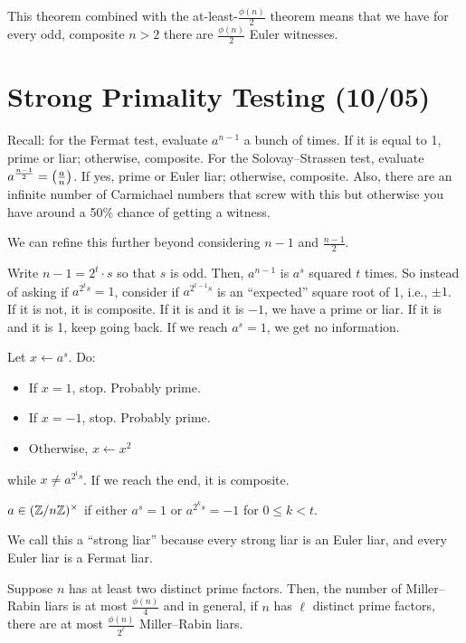 \documentclass[notes]{agony}
\newcommand{\leg}[2]{\qty(\frac{#1}{#2})}
\newcommand{\mgrp}[1]{(\Z/#1\Z)^\times}
\begin{document}
This theorem combined with the at-least-$\frac{\phi(n)}{2}$ theorem
means that we have for every odd, composite $n > 2$ there are $\frac{\phi(n)}{2}$ Euler witnesses.

\section{Strong Primality Testing (10/05)}

Recall: for the Fermat test, evaluate $a^{n-1}$ a bunch of times.
If it is equal to 1, prime or liar; otherwise, composite.
For the Solovay--Strassen test, evaluate $a^{\frac{n-1}{2}} = \leg{a}{n}$.
If yes, prime or Euler liar; otherwise, composite.
Also, there are an infinite number of Carmichael numbers that screw with this
but otherwise you have around a 50\% chance of getting a witness.

We can refine this further beyond considering $n-1$ and $\frac{n-1}{2}$.

Write $n-1 = 2^t \cdot s$ so that $s$ is odd.
Then, $a^{n-1}$ is $a^s$ squared $t$ times.
So instead of asking if $a^{2^t s} = 1$, consider if $a^{2^{t-1} s}$
is an ``expected'' square root of 1, i.e., $\pm 1$.
If it is not, it is composite.
If it is and it is $-1$, we have a prime or liar.
If it is and it is 1, keep going back.
If we reach $a^s=1$, we get no information.

\begin{lemma}
  Let $x \gets a^s$. Do:
  \begin{itemize}[nosep]
    \item If $x = 1$, stop. Probably prime.
    \item If $x = -1$, stop. Probably prime.
    \item Otherwise, $x \gets x^2$
  \end{itemize}
  while $x \neq a^{2^t s}$. If we reach the end, it is composite.
\end{lemma}

\begin{defn}
  $a \in \mgrp{n}$ if either $a^s = 1$ or $a^{2^k s} = -1$ for $0 \leq k < t$.
\end{defn}

We call this a ``strong liar'' because every strong liar is an Euler liar,
and every Euler liar is a Fermat liar.

\begin{theorem}
  Suppose $n$ has at least two distinct prime factors.
  Then, the number of Miller--Rabin liars is at most $\frac{\phi(n)}{4}$
  and in general, if $n$ has $\ell$ distinct prime factors,
  there are at most $\frac{\phi(n)}{2^\ell}$ Miller--Rabin liars.
\end{theorem}
\end{document}
